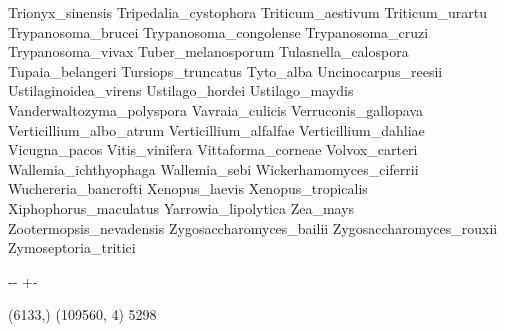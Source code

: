 \documentclass[letterpaper,10pt,english]{sphinxmanual}
\newlength\nbsphinxcodecellspacing
\begin{document}
{\begin{sphinxVerbatim}[commandchars=\\\{\}]
Trionyx\_sinensis
Tripedalia\_cystophora
Triticum\_aestivum
Triticum\_urartu
Trypanosoma\_brucei
Trypanosoma\_congolense
Trypanosoma\_cruzi
Trypanosoma\_vivax
Tuber\_melanosporum
Tulasnella\_calospora
Tupaia\_belangeri
Tursiops\_truncatus
Tyto\_alba
Uncinocarpus\_reesii
Ustilaginoidea\_virens
Ustilago\_hordei
Ustilago\_maydis
Vanderwaltozyma\_polyspora
Vavraia\_culicis
Verruconis\_gallopava
Verticillium\_albo\_atrum
Verticillium\_alfalfae
Verticillium\_dahliae
Vicugna\_pacos
Vitis\_vinifera
Vittaforma\_corneae
Volvox\_carteri
Wallemia\_ichthyophaga
Wallemia\_sebi
Wickerhamomyces\_ciferrii
Wuchereria\_bancrofti
Xenopus\_laevis
Xenopus\_tropicalis
Xiphophorus\_maculatus
Yarrowia\_lipolytica
Zea\_mays
Zootermopsis\_nevadensis
Zygosaccharomyces\_bailii
Zygosaccharomyces\_rouxii
Zymoseptoria\_tritici
\end{sphinxVerbatim}
}

{
\begin{sphinxVerbatim}[commandchars=\\\{\}]
\llap{\color{nbsphinxin}[18]:\,\hspace{\fboxrule}\hspace{\fboxsep}}

  
  
\end{sphinxVerbatim}
}

{

\kern-\sphinxverbatimsmallskipamount\kern-\baselineskip
\kern+\FrameHeightAdjust\kern-\fboxrule
\vspace{\nbsphinxcodecellspacing}

\begin{sphinxVerbatim}[commandchars=\\\{\}]
(6133,)
(109560, 4) 5298
\end{sphinxVerbatim}
}
\end{document}
